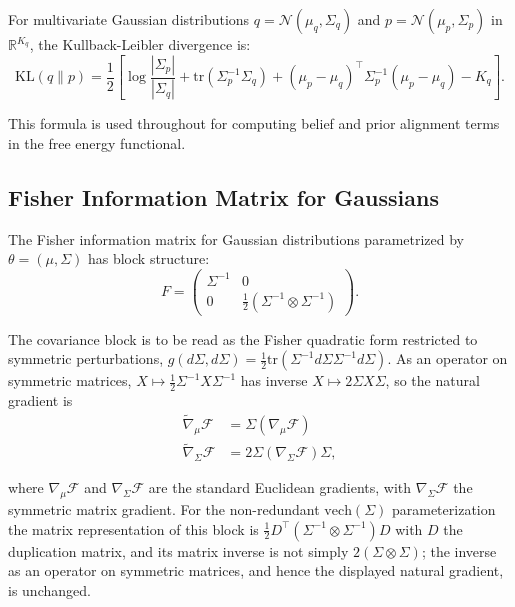 \documentclass[11pt]{article}
\begin{document}
For multivariate Gaussian distributions $q = \mathcal{N}(\mu_q, \Sigma_q)$ and $p = \mathcal{N}(\mu_p, \Sigma_p)$ in $\mathbb{R}^{K_q}$, the Kullback-Leibler divergence is:
\begin{equation}
\mathrm{KL}(q \| p) = \frac{1}{2}\left[\log\frac{|\Sigma_p|}{|\Sigma_q|} + \mathrm{tr}(\Sigma_p^{-1}\Sigma_q) + (\mu_p - \mu_q)^\top\Sigma_p^{-1}(\mu_p - \mu_q) - K_q\right].
\end{equation}

This formula is used throughout for computing belief and prior alignment terms in the free energy functional.

\subsection{Fisher Information Matrix for Gaussians}
\label{app:fisher_gaussian}

The Fisher information matrix for Gaussian distributions parametrized by $\theta = (\mu, \Sigma)$ has block structure:
\begin{equation}
F = \begin{pmatrix}
\Sigma^{-1} & 0 \\
0 & \frac{1}{2}(\Sigma^{-1} \otimes \Sigma^{-1})
\end{pmatrix}.
\end{equation}

The covariance block is to be read as the Fisher quadratic form restricted to symmetric perturbations, $g(d\Sigma, d\Sigma) = \tfrac{1}{2}\mathrm{tr}(\Sigma^{-1} d\Sigma \Sigma^{-1} d\Sigma)$. As an operator on symmetric matrices, $X \mapsto \tfrac{1}{2}\Sigma^{-1}X\Sigma^{-1}$ has inverse $X \mapsto 2\Sigma X \Sigma$, so the natural gradient is
\begin{align}
\tilde{\nabla}_\mu \mathcal{F} &= \Sigma (\nabla_\mu \mathcal{F}) \\
\tilde{\nabla}_\Sigma \mathcal{F} &= 2\Sigma (\nabla_\Sigma \mathcal{F}) \Sigma,
\end{align}

where $\nabla_\mu \mathcal{F}$ and $\nabla_\Sigma \mathcal{F}$ are the standard Euclidean gradients, with $\nabla_\Sigma \mathcal{F}$ the symmetric matrix gradient. For the non-redundant $\mathrm{vech}(\Sigma)$ parameterization the matrix representation of this block is $\tfrac{1}{2}D^\top(\Sigma^{-1} \otimes \Sigma^{-1})D$ with $D$ the duplication matrix, and its matrix inverse is not simply $2(\Sigma \otimes \Sigma)$; the inverse as an operator on symmetric matrices, and hence the displayed natural gradient, is unchanged.
\end{document}
